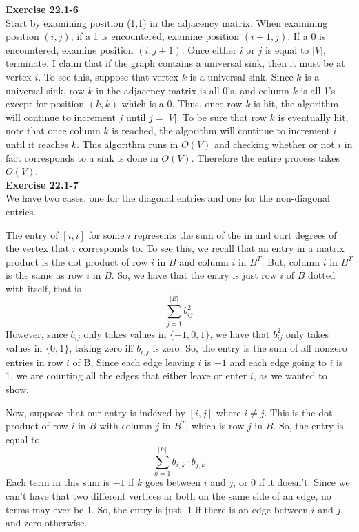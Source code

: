 \documentclass{article}
\begin{document}
\noindent\textbf{Exercise 22.1-6}\\

Start by examining position (1,1) in the adjacency matrix.  When examining position $(i,j)$, if a 1 is encountered, examine position $(i+1,j)$.  If a 0 is encountered, examine position $(i,j+1)$.  Once either $i$ or $j$ is equal to $|V|$, terminate.  I claim that if the graph contains a universal sink, then it must be at vertex $i$.  To see this, suppose that vertex $k$ is a universal sink.  Since $k$ is a universal sink, row $k$ in the adjacency matrix is all 0's, and column $k$ is all 1's except for position $(k,k)$ which is a 0.  Thus, once row $k$ is hit, the algorithm will continue to increment $j$ until $j = |V|$.  To be sure that row $k$ is eventually hit, note that once column $k$ is reached, the algorithm will continue to increment $i$ until it reaches $k$.  This algorithm runs in $O(V)$ and checking whether or not $i$ in fact corresponds to a sink is done in $O(V)$.  Therefore the entire process takes $O(V)$. \\

\noindent\textbf{Exercise 22.1-7}\\

We have two cases, one for the diagonal entries and one for the non-diagonal entries.

The entry of $[i,i]$ for some $i$ represents the sum of the in and ourt degrees of the vertex that $i$ corresponds to. To see this, we recall that an entry in a matrix product is the dot product of row $i$ in $B$ and column $i$ in $B^T$. But, column $i$ in $B^T$ is the same as row $i$ in $B$. So, we have that the entry is just row $i$ of $B$ dotted with itself, that is
\[
\sum_{j=1}^{|E|} b_{ij}^2
\]
However, since $b_{ij}$ only takes values in $\{-1,0,1\}$, we have that $b_{ij}^2$ only takes values in $\{0,1\}$, taking zero iff $b_{i,j}$ is zero. So, the entry is the sum of all nonzero entries in row $i$ of B, Since each edge leaving $i$ is $-1$ and each edge going to $i$ is 1, we are counting all the edges that either leave or enter $i$, as we wanted to show.

Now, suppose that our entry is indexed by $[i,j]$ where $i\neq j$. This is the dot product of row $i$ in $B$ with column $j$ in $B^T$, which is row $j$ in $B$. So, the entry is equal to 
\[
\sum_{k=1}^{|E|} b_{i,k}\cdot b_{j,k}
\]
Each term in this sum is $-1$ if $k$ goes between  $i$ and $j$, or $0$ if it doesn't. Since we can't have that two different vertices ar both on the same side of an edge, no terms may ever be 1. So, the entry is just -1 if there is an edge between $i$ and $j$, and zero otherwise.\\
\end{document}
